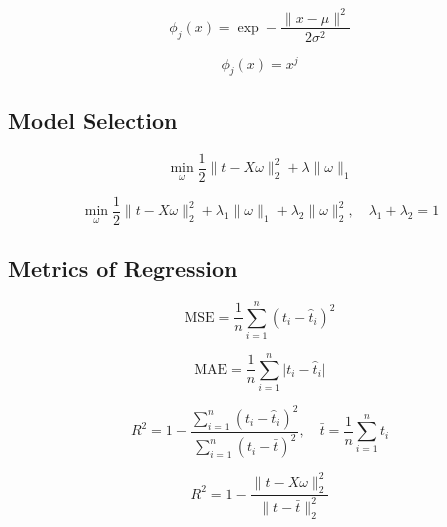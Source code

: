 \documentclass[10pt]{article}
\begin{document}
\begin{multicols}{2}
\begin{equation}
    \phi_{j}(x) = \exp -\frac{\lVert x - \mu \rVert^2}{2\sigma^{2}}
\end{equation}

\begin{equation}
    \phi_{j}(x) = x^{j}
\end{equation}

\subsection*{Model Selection}
\begin{equation}
    \label{eq:lasso}
    \min_{\omega} \frac{1}{2} \lVert{t - X\omega} \rVert^{2}_{2} + \lambda \lVert{\omega} \rVert_{1}
\end{equation}

\begin{equation}
    \label{eq:elastic-net}
    \min_{\omega} \frac{1}{2} \lVert{t - X\omega} \rVert^{2}_{2} + \lambda_{1} \lVert{\omega} \rVert_{1} + \lambda_{2} \lVert{\omega} \rVert^{2}_{2}, \quad \lambda_{1} + \lambda_{2} = 1
\end{equation}

\subsection*{Metrics of Regression}
\begin{equation}
    \label{eq:mse}
    \text{MSE} = \frac{1}{n} \sum_{i=1}^{n} (t_{i} - \hat{t}_{i})^{2}
\end{equation}

\begin{equation}
    \label{eq:mae}
    \text{MAE} = \frac{1}{n} \sum_{i=1}^{n} \lvert t_{i} - \hat{t}_{i} \rvert
\end{equation}

\begin{equation}
    \label{eq:r-squared}
    R^{2} = 1 - \frac{\sum_{i=1}^{n} (t_{i} - \hat{t}_{i})^{2}}{\sum_{i=1}^{n} (t_{i} - \bar{t})^{2}}, \quad \bar{t} = \frac{1}{n} \sum_{i=1}^{n} t_{i}
\end{equation}

\begin{equation}
    \label{eq:r-squared-2}
    R^{2} = 1 - \frac{\lVert{t - X\omega} \rVert^{2}_{2}}{\lVert{t - \bar{t}} \rVert^{2}_{2}}
\end{equation}


\end{multicols}
\end{document}
